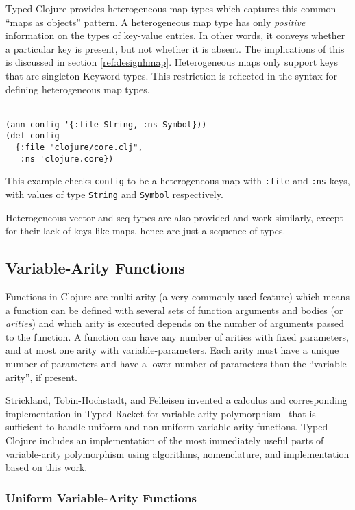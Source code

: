Typed Clojure provides heterogeneous map types which captures this common
``maps as objects'' pattern. A heterogeneous map type has only \emph{positive}
information on the types of key-value entries. In other words, it conveys
whether a particular key is present, but not whether it is absent.
The implications of this is discussed in section \ref{ref:designhmap}.
Heterogeneous maps only support keys that are singleton Keyword types. This restriction is reflected
in the syntax for defining heterogeneous map types.
\\\\
\begin{lstlisting}[caption=Heterogeneous map types in Typed Clojure]
(ann config '{:file String, :ns Symbol}))
(def config
  {:file "clojure/core.clj",
   :ns 'clojure.core})
\end{lstlisting}

This example checks \lstinline|config| to be a heterogeneous map
with \lstinline|:file| and \lstinline|:ns| keys, with values of
type \lstinline|String| and \lstinline|Symbol| respectively.

Heterogeneous vector and seq types are also provided and work similarly,
except for their lack of keys like maps, hence are just a sequence of types.

\subsection{Variable-Arity Functions}

Functions in Clojure are multi-arity (a very commonly used feature) which means a function
can be defined with several sets of function arguments and bodies (or \emph{arities})
and which arity is executed depends on the number of arguments passed
to the function. A function can have any number of arities with fixed parameters, and at most one arity with
variable-parameters. Each arity must have a unique number of
parameters and have a lower number of parameters than the ``variable arity'', if present.

Strickland, Tobin-Hochstadt, and Felleisen invented a calculus and corresponding
implementation in Typed Racket for variable-arity polymorphism~\cite{STF09}
that is sufficient to handle uniform and non-uniform variable-arity functions.
Typed Clojure includes an implementation of the most immediately useful parts of variable-arity
polymorphism using algorithms, nomenclature, and implementation based on this work.

\subsubsection{Uniform Variable-Arity Functions}

